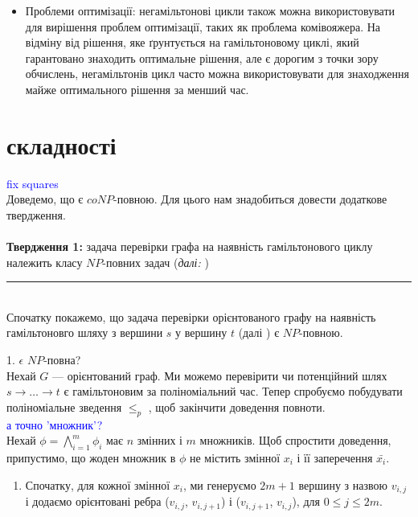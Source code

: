 \documentclass[14pt]{article}
\begin{document}
\begin{spacing}{1.175}
\begin{itemize}
\begin{itemize}
            \item Проблеми оптимізації: негамільтонові цикли також можна використовувати для вирішення проблем оптимізації, таких як проблема комівояжера. На відміну від рішення, яке ґрунтується на гамільтоновому циклі, який гарантовано знаходить оптимальне рішення, але є дорогим з точки зору обчислень, негамільтонів цикл часто можна використовувати для знаходження майже оптимального рішення за менший час.
        
        \end{itemize}
    \end{itemize}
    

    
    
    \section{ складності}
    \textcolor{blue}{fix squares}\\
    
    Доведемо, що \nonhamcycle є \(coNP\)-повною. Для цього нам знадобиться довести додаткове твердження. \\\\
    \textbf{Твердження 1:} задача перевірки графа на наявність гамільтонового циклу належить класу \(NP\)-повних задач (\textit{далі:} \hamcycle)\\
    
    \rule{0.7em}{0.7em}\\
    Спочатку покажемо, що задача перевірки орієнтованого графу на наявність гамільтоновго шляху з вершини \(s\) у вершину \(t\) (далі \dhampath)  є \(NP\)-повною.

    1. \dhampath \(\epsilon\) \(NP\)-повна?\\
    Нехай \(G\) — орієнтований граф. Ми можемо перевірити чи потенційний шлях \(s \to \dots \to t\) є гамільтоновим за поліноміальний час. Тепер спробуємо побудувати поліноміальне зведення \tsat \(\le_p\) \dhampath, щоб закінчити доведення повноти.
    \\
    \textcolor{blue}{а точно 'множник'?}\\
    Нехай \(\phi = \bigwedge_{i=1}^{m} \phi_{i}\) має \(n\) змінних і \(m\) множників. Щоб спростити доведення, припустимо, що жоден множник в \(\phi\) не містить змінної \(x_i\) і її заперечення \(\bar{x_i}\).  
    
    \begin{enumerate}
        \item  Спочатку, для кожної змінної \(x_i\), ми генеруємо \(2m+1\) вершину з назвою \(v_{i,j}\) і додаємо орієнтовані ребра (\(v_{i,j}\), \(v_{i,j+1}\)) і (\(v_{i,j+1}\), \(v_{i,j}\)), для \(0 \le j \le 2m\).
        

\end{enumerate}
\end{spacing}
\end{document}
